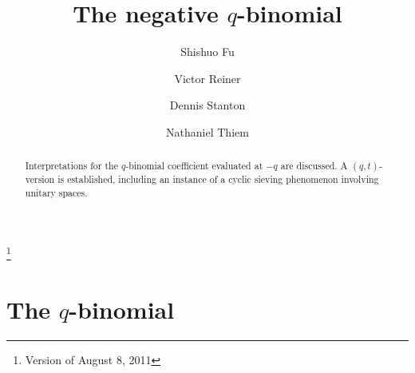 \documentclass[10pt]{amsart}
\theoremstyle{plain}
\theoremstyle{definition}
\theoremstyle{remark}
\numberwithin{equation}{section}
\begin{document}
\title[The negative $q$-binomial]{The negative $q$-binomial}
\thanks{Version of August 8, 2011}

\author{Shishuo Fu}
\address{Department of Mathematics\\
The Pennsylvania State University\\
University Park, PA 16801}


\author{Victor Reiner}
\address{School of Mathematics\\
University of  Minnesota\\
Minneapolis, MN 55455}


\author{Dennis Stanton}
\address{School of Mathematics\\
University of  Minnesota\\
Minneapolis, MN 55455}


\author{Nathaniel Thiem}
\address{Department of Mathematics\\
University of Colorado at Boulder\\
Boulder, CO 80309}


\begin{abstract} Interpretations for the
$q$-binomial coefficient evaluated at $-q$ are
discussed.  A $(q,t)$-version is established,
including an instance of a cyclic sieving phenomenon
involving unitary spaces.
\end{abstract}

\maketitle



\section{The $q$-binomial}
\end{document}
